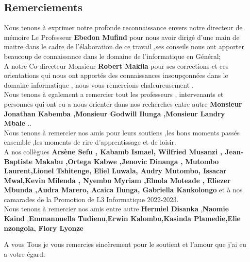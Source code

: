 \begin{center}
	\chapter*{Remerciements}
	
	Nous tenons à exprimer notre profonde reconnaissance envers notre directeur de mémoire Le Professeur \textbf{Ebedon Mufind} pour nous avoir dirigé d'une main de maitre dans le cadre de l'élaboration de ce travail ,ses conseils  nous ont apporter beaucoup de connaissance dans le domaine de l'informatique en Général;\\
	
	A notre  Co-directeur  Monsieur \textbf{Robert Makila} pour ses corrections et ces orientations qui nous ont apportés des connaissances insoupçonnées dans le domaine informatique ,  nous vous remercions chaleureusement .\\
	
	Nous  tenons à egalement a remercier tout les professeurs , intervenants et personnes  qui ont eu a nous  orienter dans nos recherches entre autre \textbf{Monsieur Jonathan Kabemba ,Monsieur Godwill Ilunga ,Monsieur Landry Mbale } ..\\
	
	Nous  tenons à remercier nos amis pour leurs soutiens ,les bons moments passés ensemble ,les moments de rire d'apprentissage et de loisir.\\
	
	A nos collègues \textbf{ Arsène Sefu , Kabamb Ismael, Wilfried Musanzi , Jean-Baptiste Makabu ,Ortega Kabwe ,Jenovic Dinanga , 
		Mutombo Laurent,Lionel Tshitenge, Eliel Luwala, Audry Mutombo, Issacar Mwal,Kevin Milenda ,  Nyembo Myriam ,Elnola Moteade , Eliezer Mbunda ,Audra Marero, Acaica Ilunga, Gabriella Kankolongo } et à nos camarades de  la Promotion de L3 Informatique 2022-2023.\\
	
	Nous tenons à remercier nos amis entre autre \textbf{Hermiel Disanka } ,\textbf{Naomie Kaind} ,\textbf{Emmannuella Tudienu},\textbf{Erwin Kalombo,Kasinda Plamedie,Elie nzongola, Flory Lyonze} 
	
	A vous Tous je vous remercies sincèrement pour le soutient et l'amour que j'ai eu a votre égard. 
	
	
	
	
\end{center}

